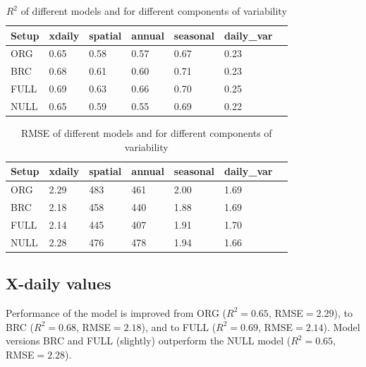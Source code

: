 \documentclass{myreport}
\begin{document}
\begin{table}
\centering
\begin{tabular}{lllllll}
  \hline
  Setup & xdaily & spatial & annual & seasonal & daily\_var \\ 
  \hline
  ORG & 0.65 & 0.58 & 0.57 & 0.67 & 0.23 \\ 
  BRC & 0.68 & 0.61 & 0.60 & 0.71 & 0.23 \\ 
  FULL & 0.69 & 0.63 & 0.66 & 0.70 & 0.25 \\ 
  NULL & 0.65 & 0.59 & 0.55 & 0.69 & 0.22 \\ 
  \end{tabular}
\caption{$R^2$ of different models and for different components of variability} 
\label{tab:rsq}
\end{table}

\begin{table}
\centering
\begin{tabular}{lllllll}
  \hline
  Setup & xdaily & spatial & annual & seasonal & daily\_var \\ 
  \hline
  ORG & 2.29 & 483 & 461 & 2.00 & 1.69 \\ 
  BRC & 2.18 & 458 & 440 & 1.88 & 1.69 \\ 
  FULL & 2.14 & 445 & 407 & 1.91 & 1.70 \\ 
  NULL & 2.28 & 476 & 478 & 1.94 & 1.66 \\ 
  \end{tabular}
\caption{RMSE of different models and for different components of variability} 
\end{table}


\subsection{X-daily values}

Performance of the model is improved from ORG ($R^2=0.65$, RMSE$=2.29$), to BRC ($R^2=0.68$, RMSE$=2.18$), and to FULL ($R^2=0.69$, RMSE$=2.14$). Model versions BRC and FULL (slightly) outperform the NULL model ($R^2=0.65$, RMSE$=2.28$).
\end{document}
